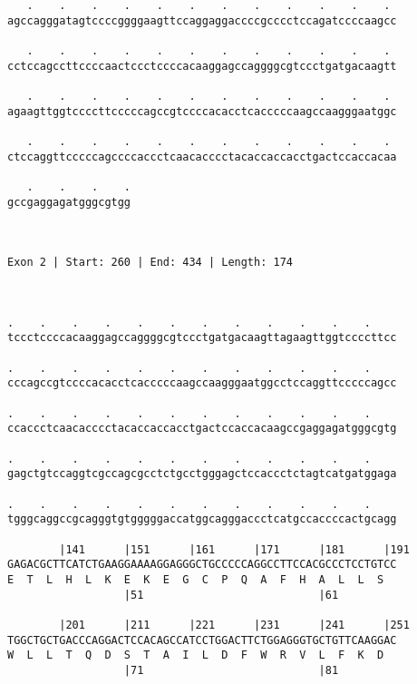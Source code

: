 \documentclass{article}
\begin{document}
\begin{Verbatim}
   .    .    .    .    .    .    .    .    .    .    .    . 
agccagggatagtccccggggaagttccaggaggaccccgcccctccagatccccaagcc
                                                            
   .    .    .    .    .    .    .    .    .    .    .    . 
cctccagccttccccaactccctccccacaaggagccaggggcgtccctgatgacaagtt
                                                            
   .    .    .    .    .    .    .    .    .    .    .    . 
agaagttggtccccttcccccagccgtccccacacctcacccccaagccaagggaatggc
                                                            
   .    .    .    .    .    .    .    .    .    .    .    . 
ctccaggttcccccagccccaccctcaacacccctacaccaccacctgactccaccacaa
                                                            
   .    .    .    .
gccgaggagatgggcgtgg
                   
                   
 
Exon 2 | Start: 260 | End: 434 | Length: 174



.    .    .    .    .    .    .    .    .    .    .    .    
tccctccccacaaggagccaggggcgtccctgatgacaagttagaagttggtccccttcc
                                                            
.    .    .    .    .    .    .    .    .    .    .    .    
cccagccgtccccacacctcacccccaagccaagggaatggcctccaggttcccccagcc
                                                            
.    .    .    .    .    .    .    .    .    .    .    .    
ccaccctcaacacccctacaccaccacctgactccaccacaagccgaggagatgggcgtg
                                                            
.    .    .    .    .    .    .    .    .    .    .    .    
gagctgtccaggtcgccagcgcctctgcctgggagctccaccctctagtcatgatggaga
                                                            
.    .    .    .    .    .    .    .    .    .    .    .    
tgggcaggccgcagggtgtgggggaccatggcagggaccctcatgccaccccactgcagg
                                                            
        |141      |151      |161      |171      |181      |191
GAGACGCTTCATCTGAAGGAAAAGGAGGGCTGCCCCCAGGCCTTCCACGCCCTCCTGTCC
E  T  L  H  L  K  E  K  E  G  C  P  Q  A  F  H  A  L  L  S  
                  |51                           |61         
  
        |201      |211      |221      |231      |241      |251
TGGCTGCTGACCCAGGACTCCACAGCCATCCTGGACTTCTGGAGGGTGCTGTTCAAGGAC
W  L  L  T  Q  D  S  T  A  I  L  D  F  W  R  V  L  F  K  D  
                  |71                           |81         
  

\end{Verbatim}
\end{document}
